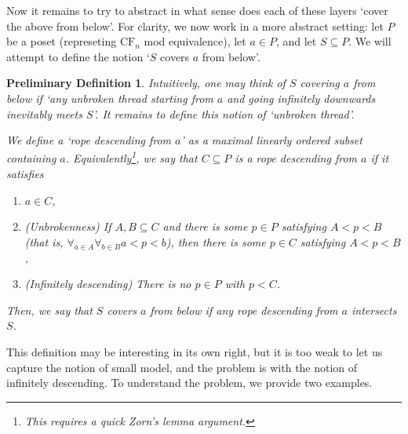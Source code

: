 \documentclass{article}
\newtheorem{prelimdef}[theorem]{Preliminary Definition}
\theoremstyle{nonumberplain}
\newcommand{\CF}{\mathrm{CF}}
\begin{document}
Now it remains to try to abstract in what sense does each of these layers `cover the above from below'. For clarity, we now work in a more abstract setting: let $P$ be a poset (represeting $\CF_n$ mod equivalence), let $a \in P$, and let $S \subseteq P$. We will attempt to define the notion `$S$ covers $a$ from below'.

\begin{prelimdef}\label{pdef:below1}
Intuitively, one may think of $S$ covering $a$ from below if `any unbroken thread starting from $a$ and going infinitely downwards inevitably meets $S$'. It remains to define this notion of `unbroken thread'.

We define a `rope descending from $a$' as a maximal linearly ordered subset containing $a$. Equivalently\footnote{This requires a quick Zorn's lemma argument.}, we say that $C \subseteq P$ is a rope descending from $a$ if it satisfies
\begin{enumerate}
\item\label{item:rope1} $a \in C$,
\item\label{item:rope2} (Unbrokenness) If $A, B \subseteq C$ and there is some $p \in P$ satisfying $A < p < B$ (that is, $\forall_{a \in A} \forall_{b \in B} a < p < b$), then there is some $p \in C$ satisfying $A < p < B$,
\item\label{item:rope3} (Infinitely descending) There is no $p \in P$ with $p < C$. 
\end{enumerate}

Then, we say that $S$ covers $a$ from below if any rope descending from $a$ intersects $S$.
\end{prelimdef}

This definition may be interesting in its own right, but it is too weak to let us capture the notion of small model, and the problem is with the notion of infinitely descending. To understand the problem, we provide two examples.
\end{document}
